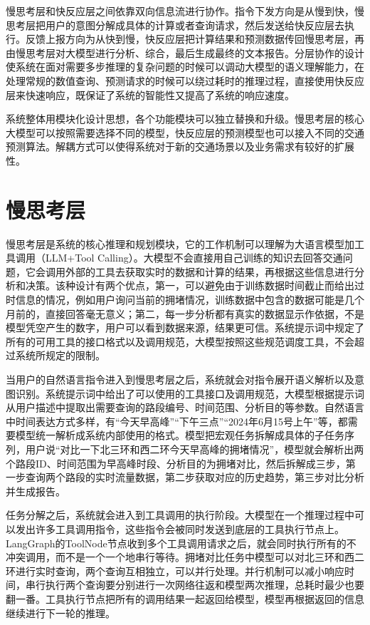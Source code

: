 慢思考层和快反应层之间依靠双向信息流进行协作。指令下发方向是从慢到快，慢思考层把用户的意图分解成具体的计算或者查询请求，然后发送给快反应层去执行。反馈上报方向为从快到慢，快反应层把计算结果和预测数据传回慢思考层，再由慢思考层对大模型进行分析、综合，最后生成最终的文本报告。分层协作的设计使系统在面对需要多步推理的复杂问题的时候可以调动大模型的语义理解能力，在处理常规的数值查询、预测请求的时候可以绕过耗时的推理过程，直接使用快反应层来快速响应，既保证了系统的智能性又提高了系统的响应速度。

系统整体用模块化设计思想，各个功能模块可以独立替换和升级。慢思考层的核心大模型可以按照需要选择不同的模型，快反应层的预测模型也可以接入不同的交通预测算法。解耦方式可以使得系统对于新的交通场景以及业务需求有较好的扩展性。


\section{慢思考层}

慢思考层是系统的核心推理和规划模块，它的工作机制可以理解为大语言模型加工具调用（LLM+Tool Calling）。大模型不会直接用自己训练的知识去回答交通问题，它会调用外部的工具去获取实时的数据和计算的结果，再根据这些信息进行分析和决策。该种设计有两个优点，第一，可以避免由于训练数据时间截止而给出过时信息的情况，例如用户询问当前的拥堵情况，训练数据中包含的数据可能是几个月前的，直接回答毫无意义；第二，每一步分析都有真实的数据显示作依据，不是模型凭空产生的数字，用户可以看到数据来源，结果更可信。系统提示词中规定了所有的可用工具的接口格式以及调用规范，大模型按照这些规范调度工具，不会超过系统所规定的限制。

当用户的自然语言指令进入到慢思考层之后，系统就会对指令展开语义解析以及意图识别。系统提示词中给出了可以使用的工具接口及调用规范，大模型根据提示词从用户描述中提取出需要查询的路段编号、时间范围、分析目的等参数。自然语言中时间表达方式多样，有“今天早高峰”“下午三点”“2024年6月15号上午”等，都需要模型统一解析成系统内部使用的格式。模型把宏观任务拆解成具体的子任务序列，用户说“对比一下北三环和西二环今天早高峰的拥堵情况”，模型就会解析出两个路段ID、时间范围为早高峰时段、分析目的为拥堵对比，然后拆解成三步，第一步查询两个路段的实时流量数据，第二步获取对应的历史趋势，第三步对比分析并生成报告。

任务分解之后，系统就会进入到工具调用的执行阶段。大模型在一个推理过程中可以发出许多工具调用指令，这些指令会被同时发送到底层的工具执行节点上。LangGraph的ToolNode节点收到多个工具调用请求之后，就会同时执行所有的不冲突调用，而不是一个一个地串行等待。拥堵对比任务中模型可以对北三环和西二环进行实时查询，两个查询互相独立，可以并行处理。并行机制可以减小响应时间，串行执行两个查询要分别进行一次网络往返和模型两次推理，总耗时最少也要翻一番。工具执行节点把所有的调用结果一起返回给模型，模型再根据返回的信息继续进行下一轮的推理。

